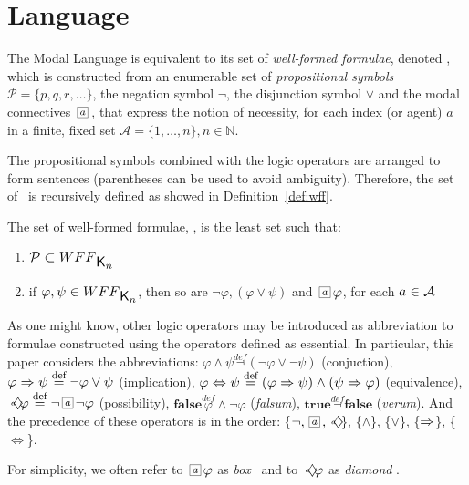 \section{Language}
\label{sec:language}

The Modal Language  is equivalent to its set of \emph{well-formed
formulae}, denoted \wff, which is constructed from an enumerable set of
\emph{propositional symbols} $\mathcal{P} = \{p, q, r, \ldots\}$, the negation
symbol $\neg$, the disjunction symbol $\lor$ and the modal connectives
$\nec{a}$, that express the notion of necessity, for each index (or agent) $a$
in a finite, fixed set $\mathcal{A} = \{1, \ldots, n\}, n \in \mathbb{N}$.

The propositional symbols combined with the logic operators are arranged to form
sentences (parentheses can be used to avoid ambiguity). Therefore, the set
of \wff~is recursively defined as showed in Definition~\ref{def:wff}.

\begin{definition}
\label{def:wff}
    The set of well-formed formulae, \wff, is the least set such that:
    \begin{enumerate}
        \item $\mathcal{P} \subset \wff$
            \vspace{.2ex}
        \item if $\varphi, \psi \in \wff$, then so are $\neg \varphi, (\varphi
            \lor \psi)$ and $\nec{a} \varphi$, for each $a \in \Agents$
    \end{enumerate}
\end{definition}

As one might know, other logic operators may be introduced as abbreviation to
formulae constructed using the operators defined as essential. In particular,
this paper considers the abbreviations:
$\varphi \wedge \psi \stackrel{def} \neg(\neg \varphi \lor \neg \psi)$
(conjuction),
$\varphi \then \psi \stackrel{def} \neg \varphi \lor \psi$ (implication),
$\varphi \iff \psi \stackrel{def} (\varphi \then \psi) \land (\psi \then
\varphi)$ (equivalence),
$\pos{a} \varphi \stackrel{def} \neg \nec{a} \neg \varphi$ (possibility),
$\textbf{false} \stackrel{def} \varphi \wedge \neg \varphi$ (\emph{falsum}),
$ \textbf{true} \stackrel{def} \neg \textbf{false}$ (\emph{verum}).
And the precedence of these operators is in the order: 
\{$\neg, \nec{a}, \pos{a}$\},
\{$\wedge$\},
\{$\lor$\},
\{$\then$\},
\{$\iff$\}.

For simplicity, we often refer to $\nec{a} \formula$ as \emph{box} \formula~and to
$\pos{a} \formula$ as \emph{diamond} \formula.

